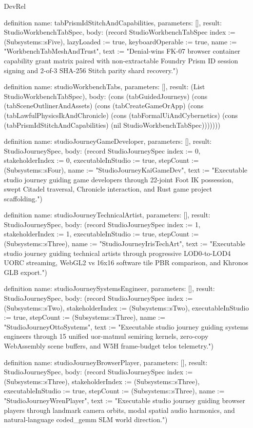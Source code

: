 \begin{lexlean}{DevRel}
\begin{semanticmodule}
definition{
  name: tabPrismIdStitchAndCapabilities,
  parameters: [],
  result: StudioWorkbenchTabSpec,
  body: (record StudioWorkbenchTabSpec {index := (Subsystems::sFive), lazyLoaded := true, keyboardOperable := true, name := "WorkbenchTabMeshAndTrust", text := "Denial-wins FK-07 browser container capability grant matrix paired with non-extractable Foundry Prism ID session signing and 2-of-3 SHA-256 Stitch parity shard recovery."})
}

definition{
  name: studioWorkbenchTabs,
  parameters: [],
  result: (List StudioWorkbenchTabSpec),
  body: (cons (tabGuidedJourneys) (cons (tabSceneOutlinerAndAssets) (cons (tabCreateGameOrApp) (cons (tabLawfulPhysicsIkAndChronicle) (cons (tabFormalUiAndCybernetics) (cons (tabPrismIdStitchAndCapabilities) (nil StudioWorkbenchTabSpec)))))))
}

definition{
  name: studioJourneyGameDeveloper,
  parameters: [],
  result: StudioJourneySpec,
  body: (record StudioJourneySpec {index := 0, stakeholderIndex := 0, executableInStudio := true, stepCount := (Subsystems::sFour), name := "StudioJourneyKaiGameDev", text := "Executable studio journey guiding game developers through 22-joint Foot IK possession, swept Citadel traversal, Chronicle interaction, and Rust game project scaffolding."})
}

definition{
  name: studioJourneyTechnicalArtist,
  parameters: [],
  result: StudioJourneySpec,
  body: (record StudioJourneySpec {index := 1, stakeholderIndex := 1, executableInStudio := true, stepCount := (Subsystems::sThree), name := "StudioJourneyIrisTechArt", text := "Executable studio journey guiding technical artists through progressive LOD0-to-LOD4 UORC streaming, WebGL2 vs 16x16 software tile PBR comparison, and Khronos GLB export."})
}

definition{
  name: studioJourneySystemsEngineer,
  parameters: [],
  result: StudioJourneySpec,
  body: (record StudioJourneySpec {index := (Subsystems::sTwo), stakeholderIndex := (Subsystems::sTwo), executableInStudio := true, stepCount := (Subsystems::sThree), name := "StudioJourneyOttoSystems", text := "Executable studio journey guiding systems engineers through 15 unified uor-matmul semiring kernels, zero-copy WebAssembly scene buffers, and W5H frame-budget telos telemetry."})
}

definition{
  name: studioJourneyBrowserPlayer,
  parameters: [],
  result: StudioJourneySpec,
  body: (record StudioJourneySpec {index := (Subsystems::sThree), stakeholderIndex := (Subsystems::sThree), executableInStudio := true, stepCount := (Subsystems::sThree), name := "StudioJourneyWrenPlayer", text := "Executable studio journey guiding browser players through landmark camera orbits, modal spatial audio harmonics, and natural-language coded_gemm SLM world direction."})
}


\end{semanticmodule}
\end{lexlean}
